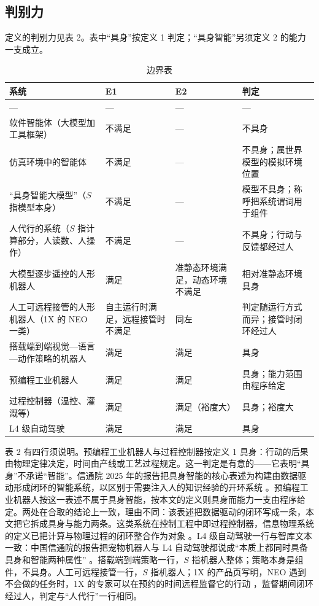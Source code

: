 \documentclass[10pt,fontset=fandol]{ctexart}
\begin{document}
\subsection{判别力}

定义的判别力见表 2。表中“具身”按定义 1 判定；“具身智能”另须定义 2 的能力一支成立。

\begin{table}[htbp]
\centering
\caption{边界表}
\small
\begin{tabularx}{\textwidth}{>{\raggedright\arraybackslash}p{5.2cm}>{\raggedright\arraybackslash}p{3.0cm}>{\raggedright\arraybackslash}p{2.2cm}Y}
\toprule
系统 & E1 & E2 & 判定 \\
\midrule
--- & --- & --- & --- \\
软件智能体（大模型加工具框架） & 不满足 & — & 不具身 \\
仿真环境中的智能体 & 不满足 & — & 不具身；属世界模型的模拟环境位置 \\
“具身智能大模型”（$S$ 指模型本身） & 不满足 & — & 模型不具身；称呼把系统谓词用于组件 \\
人代行的系统（$S$ 指计算部分，人读数、人操作） & 不满足 & — & 不具身；行动与反馈都经过人 \\
大模型逐步遥控的人形机器人 & 满足 & 准静态环境满足，动态环境不满足 & 相对准静态环境具身 \\
人工可远程接管的人形机器人（1X 的 NEO 一类） & 自主运行时满足，远程接管时不满足 & 同左 & 判定随运行方式而异；接管时闭环经过人 \\
搭载端到端视觉—语言—动作策略的机器人 & 满足 & 满足 & 具身 \\
预编程工业机器人 & 满足 & 满足 & 具身；能力范围由程序给定 \\
过程控制器（温控、灌溉等） & 满足 & 满足（裕度大） & 具身；裕度大 \\
L4 级自动驾驶 & 满足 & 满足 & 具身 \\
\bottomrule
\end{tabularx}
\end{table}
表 2 有四行须说明。预编程工业机器人与过程控制器按定义 1 具身：行动的后果由物理定律决定，时间由产线或工艺过程规定。这一判定是有意的——它表明“具身”不承诺“智能”。信通院 2025 年的报告把具身智能的核心表述为构建由数据驱动形成闭环的智能系统，以区别于需要注入人的知识经验的开环系统 \cite{caict2025}。预编程工业机器人按这一表述不属于具身智能，按本文的定义则具身而能力一支由程序给定。两处在合取的结论上一致，理由不同：该表述把数据驱动的闭环写成一条，本文把它拆成具身与能力两条。这类系统在控制工程中即过程控制器，信息物理系统的定义已把计算与物理过程的闭环整合作为对象 \cite{lee2008}。L4 级自动驾驶一行与智库文本一致：中国信通院的报告把宠物机器人与 L4 自动驾驶都说成“本质上都同时具备具身和智能两种属性” \cite{caict2024}。搭载端到端策略一行，$S$ 指机器人整体；策略本身是组件，不具身。人工可远程接管一行，$S$ 指机器人；1X 的产品页写明，NEO 遇到不会做的任务时，1X 的专家可以在预约的时间远程监督它的行动 \cite{onex2026}，监督期间闭环经过人，判定与“人代行”一行相同。
\end{document}

